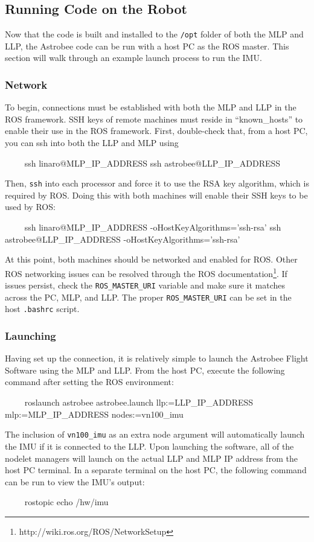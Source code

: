 \documentclass{article}
\begin{document}
\subsection{Running Code on the Robot}
Now that the code is built and installed to the \texttt{/opt} folder of both the MLP and LLP, the Astrobee code can be run with a host PC as the ROS master. This section will walk through an example launch process to run the IMU.

\subsubsection{Network}
To begin, connections must be established with both the MLP and LLP in the ROS framework. SSH keys of remote machines must reside in ``known\_hosts'' to enable their use in the ROS framework. First, double-check that, from a host PC, you can ssh into both the LLP and MLP using 
\begin{markdown}
~~~~
ssh linaro@{MLP_IP_ADDRESS}  
ssh astrobee@{LLP_IP_ADDRESS}
~~~~
\end{markdown}

Then, \texttt{ssh} into each processor and force it to use the RSA key algorithm, which is required by ROS. Doing this with both machines will enable their SSH keys to be used by ROS:
\begin{markdown}
~~~~
ssh linaro@{MLP_IP_ADDRESS} -oHostKeyAlgorithms='ssh-rsa' 
ssh astrobee@{LLP_IP_ADDRESS} -oHostKeyAlgorithms='ssh-rsa' 
~~~~
\end{markdown}

At this point, both machines should be networked and enabled for ROS. Other ROS networking issues can be resolved through the ROS documentation\footnote{http://wiki.ros.org/ROS/NetworkSetup}. If issues persist, check the \texttt{ROS\_MASTER\_URI} variable and make sure it matches across the PC, MLP, and LLP. The proper \texttt{ROS\_MASTER\_URI} can be set in the host \texttt{.bashrc} script.


\subsubsection{Launching}
Having set up the connection, it is relatively simple to launch the Astrobee Flight Software using the MLP and LLP. From the host PC, execute the following command after setting the ROS environment:
\begin{markdown}
~~~~
roslaunch astrobee astrobee.launch llp:={LLP_IP_ADDRESS} mlp:={MLP_IP_ADDRESS}  
nodes:=vn100_imu
~~~~
\end{markdown}
The inclusion of \texttt{vn100\_imu} as an extra node argument will automatically launch the IMU if it is connected to the LLP. Upon launching the software, all of the nodelet managers will launch on the actual LLP and MLP IP address from the host PC terminal. In a separate terminal on the host PC, the following command can be run to view the IMU's output:
\begin{markdown}
~~~~
rostopic echo /hw/imu
~~~~
\end{markdown}
\end{document}
